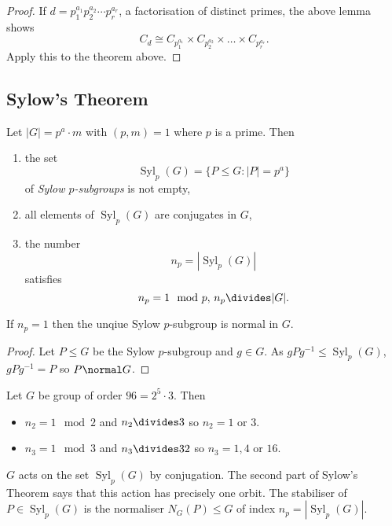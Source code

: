 \documentclass[a4paper]{article}
\theoremstyle{definition}
\DeclareMathOperator{\syl}{Syl}
\begin{document}
\begin{proof}
  If \(d = p_1^{a_1}p_2^{a_2}\cdots p_r^{a_r}\), a factorisation of distinct primes, the above lemma shows
  \[
    C_d \cong C_{p_1^{a_1}} \times C_{p_2^{a_2}} \times \dots \times C_{p_r^{a_r}}.
  \]
  Apply this to the theorem above.
\end{proof}

\subsection{Sylow's Theorem}

\begin{theorem}
  \label{thm:sylow}
  Let \(|G| = p^a \cdot m\) with \((p, m) = 1\) where \(p\) is a prime. Then
  \begin{enumerate}
  \item the set
    \[
      \syl_p(G) = \{P \leq G: |P| = p^a\}
    \]
    of \emph{Sylow \(p\)-subgroups} is not empty,
  \item all elements of \(\syl_p(G)\) are conjugates in \(G\),
  \item the number
    \[
      n_p = |\syl_p(G)|
    \]
    satisfies
    \[
      n_p = 1 \mod p, \, n_p \divides |G|.
    \]
  \end{enumerate}
\end{theorem}

\begin{lemma}
  If \(n_p = 1\) then the unqiue Sylow \(p\)-subgroup is normal in \(G\).
\end{lemma}

\begin{proof}
  Let \(P \leq G\) be the Sylow \(p\)-subgroup and \(g \in G\). As \(gPg^{-1} \leq \syl_p(G)\), \(gPg^{-1} = P\) so \(P \normal G\).
\end{proof}

\begin{eg}
  Let \(G\) be group of order \(96 = 2^5 \cdot 3\). Then
  \begin{itemize}
  \item \(n_2 = 1 \mod 2\) and \(n_2 \divides 3\) so \(n_2 = 1\) or \(3\).
  \item \(n_3 = 1 \mod 3\) and \(n_3 \divides 32\) so \(n_3 = 1, 4\) or \(16\).
  \end{itemize}
\end{eg}

\(G\) acts on the set \(\syl_p(G)\) by conjugation. The second part of Sylow's Theorem says that this action has precisely one orbit. The stabiliser of \(P \in \syl_p(G)\) is the normaliser \(N_G(P) \leq G\) of index \(n_p = |\syl_p(G)|\).
\end{document}
